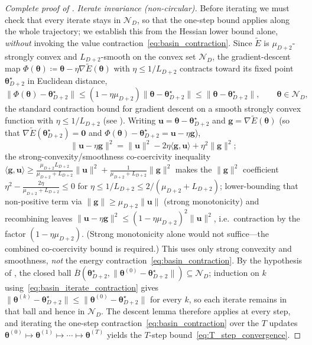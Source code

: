 \documentclass[11pt]{article}
\newcommand{\cN}{\mathcal{N}}
\theoremstyle{plain}
\theoremstyle{plain}
\begin{document}
\begin{proof}[Complete proof of ]
\emph{Iterate invariance (non-circular).}
Before iterating we must check that every iterate stays in $\cN_D$, so
that the one-step bound applies along the whole trajectory; we establish
this from the Hessian lower bound alone, \emph{without} invoking the
value contraction~\eqref{eq:basin_contraction}.  Since $\widetilde{E}$ is
$\mu_{D+2}$-strongly convex and $L_{D+2}$-smooth on the convex set
$\cN_D$, the gradient-descent map
$\Phi(\bm\theta)\coloneqq\bm\theta-\eta\nabla\widetilde{E}(\bm\theta)$ with
$\eta\le 1/L_{D+2}$ contracts toward its fixed point
$\bm\theta_{D+2}^\star$ in Euclidean distance,
\begin{equation}\label{eq:basin_iterate_contraction}
  \|\Phi(\bm\theta)-\bm\theta_{D+2}^\star\|
  \le(1-\eta\mu_{D+2}) \|\bm\theta-\bm\theta_{D+2}^\star\|
  \le\|\bm\theta-\bm\theta_{D+2}^\star\| ,
  \qquad\bm\theta\in\cN_D,
\end{equation}
the standard contraction bound for gradient descent on a smooth strongly
convex function with $\eta\le 1/L_{D+2}$
(see \cite[\S3.4.2]{bubeck2015convex}).  Writing
$\bm u=\bm\theta-\bm\theta_{D+2}^\star$ and
$\bm g=\nabla\widetilde{E}(\bm\theta)$ (so that
$\nabla\widetilde{E}(\bm\theta_{D+2}^\star)=\bm 0$ and
$\Phi(\bm\theta)-\bm\theta_{D+2}^\star=\bm u-\eta\bm g$),
\[
  \|\bm u-\eta\bm g\|^2
  =\|\bm u\|^2-2\eta\langle\bm g,\bm u\rangle+\eta^2\|\bm g\|^2 ;
\]
the strong-convexity/smoothness co-coercivity inequality
$\langle\bm g,\bm u\rangle\ge
\tfrac{\mu_{D+2}L_{D+2}}{\mu_{D+2}+L_{D+2}}\|\bm u\|^2
+\tfrac{1}{\mu_{D+2}+L_{D+2}}\|\bm g\|^2$ makes the $\|\bm g\|^2$
coefficient $\eta^2-\tfrac{2\eta}{\mu_{D+2}+L_{D+2}}\le0$ for
$\eta\le 1/L_{D+2}\le 2/(\mu_{D+2}+L_{D+2})$; lower-bounding that
non-positive term via $\|\bm g\|\ge\mu_{D+2}\|\bm u\|$ (strong monotonicity)
and recombining leaves
$\|\bm u-\eta\bm g\|^2\le(1-\eta\mu_{D+2})^2\|\bm u\|^2$, i.e.\ contraction
by the factor $(1-\eta\mu_{D+2})$.  (Strong monotonicity alone would not
suffice---the combined co-coercivity bound is required.)  This uses only
strong convexity and smoothness, \emph{not} the energy
contraction~\eqref{eq:basin_contraction}.  By the hypothesis of
, the closed ball
$\overline{B}(\bm\theta_{D+2}^\star,\|\bm\theta^{(0)}
-\bm\theta_{D+2}^\star\|)\subseteq\cN_D$; induction on $k$
using~\eqref{eq:basin_iterate_contraction} gives
$\|\bm\theta^{(k)}-\bm\theta_{D+2}^\star\|
\le\|\bm\theta^{(0)}-\bm\theta_{D+2}^\star\|$ for every $k$, so each iterate
remains in that ball and hence in $\cN_D$.  The descent lemma therefore
applies at every step, and iterating the one-step
contraction~\eqref{eq:basin_contraction} over the $T$ updates
$\bm\theta^{(0)}\mapsto\bm\theta^{(1)}\mapsto\cdots\mapsto\bm\theta^{(T)}$
yields the $T$-step bound~\eqref{eq:T_step_convergence}.


\end{proof}
\end{document}
